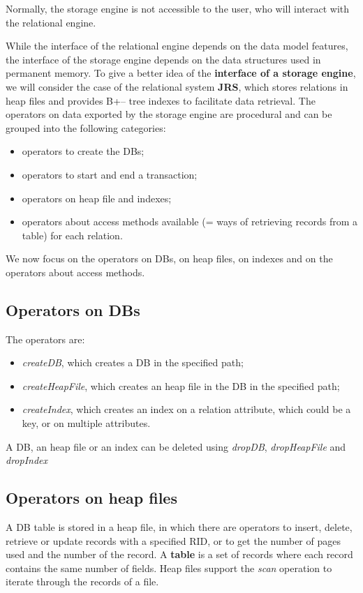 Normally, the storage engine is not accessible to the user, who will interact with the relational engine.

While the interface of the relational engine depends on the data model features, the interface of the storage engine depends on the data structures used in permanent memory. To give a better idea of the \textbf{interface of a storage engine}, we will consider the case of the relational system \textbf{JRS}, which stores relations in heap files and provides B+– tree indexes to facilitate data retrieval. The operators on data exported by the storage engine are procedural and can be grouped into the following categories:

\begin{itemize}
    \item operators to create the DBs;
    \item operators to start and end a transaction;
    \item operators on heap file and indexes;
    \item operators about access methods available (= ways of retrieving records from a table) for each relation.
\end{itemize}

We now focus on the operators on DBs, on heap files, on indexes and on the operators about access methods.

\subsection{Operators on DBs}
The operators are:
\begin{itemize}
    \item \textit{createDB}, which creates a DB in the specified path;
    \item \textit{createHeapFile}, which creates an heap file in the DB in the specified path;
    \item \textit{createIndex}, which creates an index on a relation attribute, which could be a key, or on multiple attributes.
\end{itemize}

A DB, an heap file or an index can be deleted using \textit{dropDB}, \textit{dropHeapFile} and \textit{dropIndex}

\subsection{Operators on heap files}
A DB table is stored in a heap file, in which there are operators to insert, delete, retrieve or update records with a specified RID, or to get the number of pages used and the number of the record. A \textbf{table} is a set of records where each record contains the same number of fields. Heap files support the \textit{scan} operation to iterate through the records of a file.

